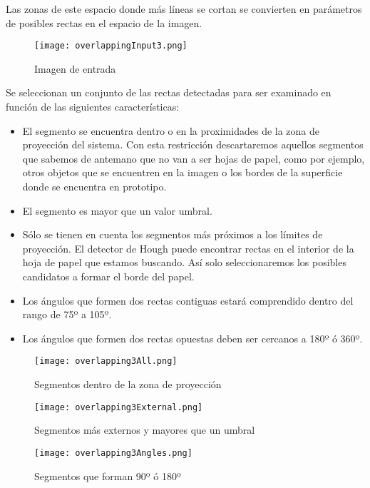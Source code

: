 Las zonas de este espacio donde más líneas se cortan se convierten en parámetros de posibles rectas
en el espacio de la imagen.

 \begin{figure}[h!] 
    \centering
    \texttt{[image: overlappingInput3.png]}
    \caption{Imagen de entrada}
    \label{fig:overlapping}
  \end{figure}

Se seleccionan un conjunto de las rectas detectadas para ser examinado en función de las siguientes características:

\begin{itemize}
\item El segmento se encuentra dentro o en la proximidades de la zona de proyección del
  sistema. Con esta restricción descartaremos aquellos segmentos que sabemos de antemano que no van
  a ser hojas de papel, como por ejemplo, otros objetos que se encuentren en la imagen o los bordes
  de la superficie donde se encuentra en prototipo.
  
\item El segmento es mayor que un valor umbral.
\item Sólo se tienen en cuenta los segmentos más próximos a los límites de proyección. El detector
  de Hough puede encontrar rectas en el interior de la hoja de papel que estamos buscando. Así solo
  seleccionaremos los posibles candidatos a formar el borde del papel.
 \item Los ángulos que formen dos rectas contiguas estará comprendido dentro del rango de 75º a 105º.
\item Los ángulos que formen dos rectas opuestas deben ser cercanos a 180º ó 360º.
\end{itemize}

\begin{figure} 
    \centering
    \texttt{[image: overlapping3All.png]}
    \caption{Segmentos dentro de la zona de proyección}
    \label{fig:overlappingAll}
  \end{figure}
  
 \begin{figure} 
    \centering
    \texttt{[image: overlapping3External.png]}
    \caption{Segmentos más externos y mayores que un umbral}
    \label{fig:overlappingExt}
  \end{figure}

  \begin{figure} 
    \centering
    \texttt{[image: overlapping3Angles.png]}
    \caption{Segmentos que forman 90º ó 180º}
    \label{fig:overlappingAngles}
  \end{figure}

